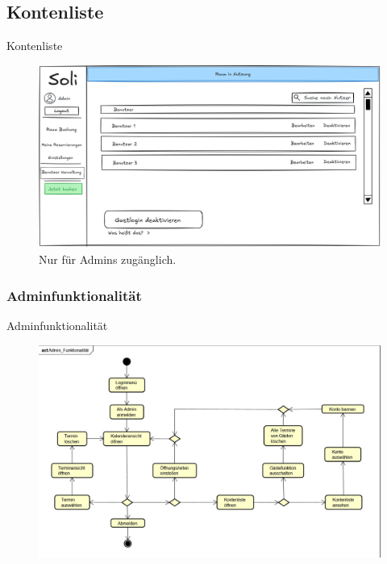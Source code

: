 \documentclass{sdqbeamer}
\begin{document}
\subsection{Kontenliste}
\begin{frame}{Kontenliste}
    \begin{figure}
        \centering
        \includegraphics[width=\textwidth]{pictures/figures/ui/useradminui}
        \caption{Nur für Admins zugänglich.}
        \label{fig:kontenliste}
    \end{figure}
\end{frame}

\subsubsection{Adminfunktionalität}
\begin{frame}{Adminfunktionalität}
    \begin{figure}
        \centering
        \includegraphics[width=\textwidth]{pictures/figures/activity/adminfunk}
        \label{fig:adminfunktionalitaet}
    \end{figure}
\end{frame}

\end{document}
